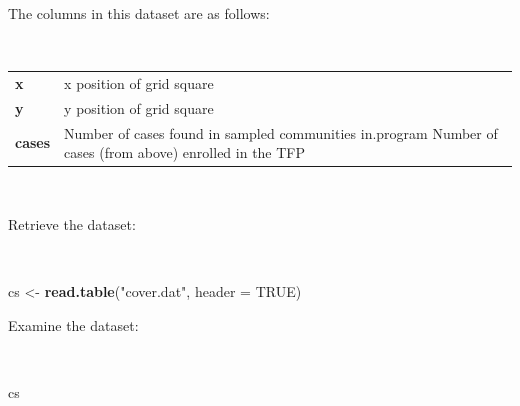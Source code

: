 \documentclass[12pt,a4paper]{book}
\newenvironment{Shaded}{\begin{snugshade}}{\end{snugshade}}
\newcommand{\KeywordTok}[1]{\textcolor[rgb]{0.13,0.29,0.53}{\textbf{#1}}}
\newcommand{\DataTypeTok}[1]{\textcolor[rgb]{0.13,0.29,0.53}{#1}}
\newcommand{\StringTok}[1]{\textcolor[rgb]{0.31,0.60,0.02}{#1}}
\newcommand{\OtherTok}[1]{\textcolor[rgb]{0.56,0.35,0.01}{#1}}
\newcommand{\NormalTok}[1]{#1}
\theoremstyle{definition}
\theoremstyle{definition}
\theoremstyle{definition}
\theoremstyle{remark}
\begin{document}
The columns in this dataset are as follows:

~

\begin{longtable}[]{@{}ll@{}}
\toprule
\begin{minipage}[t]{0.09\columnwidth}\raggedright
\textbf{x}\strut
\end{minipage} & \begin{minipage}[t]{0.85\columnwidth}\raggedright
x position of grid square\strut
\end{minipage}\tabularnewline
\begin{minipage}[t]{0.09\columnwidth}\raggedright
\textbf{y}\strut
\end{minipage} & \begin{minipage}[t]{0.85\columnwidth}\raggedright
y position of grid square\strut
\end{minipage}\tabularnewline
\begin{minipage}[t]{0.09\columnwidth}\raggedright
\textbf{cases}\strut
\end{minipage} & \begin{minipage}[t]{0.85\columnwidth}\raggedright
Number of cases found in sampled communities in.program Number of cases
(from above) enrolled in the TFP\strut
\end{minipage}\tabularnewline
\bottomrule
\end{longtable}

~

Retrieve the dataset:

~

\begin{Shaded}
\begin{Highlighting}[]
\NormalTok{cs <-}\StringTok{ }\KeywordTok{read.table}\NormalTok{(}\StringTok{"cover.dat"}\NormalTok{, }\DataTypeTok{header =} \OtherTok{TRUE}\NormalTok{)}
\end{Highlighting}
\end{Shaded}

\newpage

Examine the dataset:

~

\begin{Shaded}
\begin{Highlighting}[]
\NormalTok{cs}
\end{Highlighting}
\end{Shaded}
\end{document}
